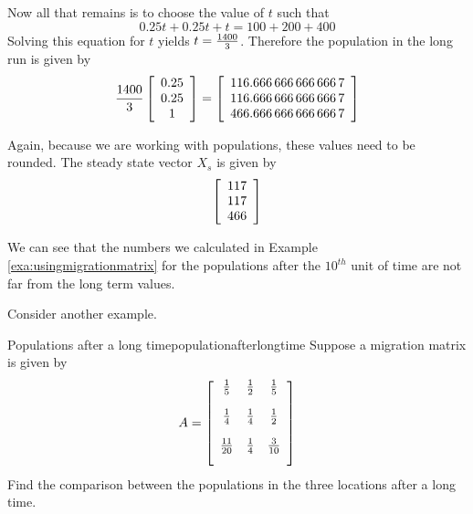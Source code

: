 \begin{solution}
Now all that remains is to choose the value of $t$ such that
\begin{equation*}
0.25t+0.25t+t=100+200+400
\end{equation*}
Solving this equation for $t$ yields $t=\vspace{.05in} \frac{1400}{3}$. Therefore the population in the long run
is given by
\begin{equation*}
\vspace{.05in} \frac{1400}{3}\leftB
\begin{array}{c}
0.25 \\
0.25 \\
1
\end{array}
\rightB = \leftB
\begin{array}{c}
116. 666\,666\,666\, 666\,7 \\
116. 666\,666\,666\, 666\,7 \\
466. 666\,666\,666\, 666\,7
\end{array}
\rightB 
\end{equation*}

Again, because we are working with populations, these values need to be rounded. The steady state vector $X_s$ is given by
\[
\left[
\begin{array}{c}
117 \\
117 \\
466
\end{array}
\right] 
\]
\end{solution}

We can see that the numbers we calculated in Example \ref{exa:usingmigrationmatrix} for the populations
after the $10^{th}$ unit of time are not far from the long term values. 

Consider another example.

\begin{example}{Populations after a long time}{populationafterlongtime}
Suppose a migration matrix is given by 
\begin{equation*}
A = \leftB
\begin{array}{ccc}
\vspace{.05in} \frac{1}{5} & \vspace{.05in} \frac{1}{2} & \vspace{.05in}
\frac{1}{5} \\
\vspace{.05in} \frac{1}{4} & \vspace{.05in} \frac{1}{4} & \vspace{.05in}
\frac{1}{2} \\
\vspace{.05in} \frac{11}{20} & \vspace{.05in} \frac{1}{4} & \vspace{.05in}
\frac{3}{10}
\end{array}
\rightB 
\end{equation*}
 Find the comparison between the populations in the three
locations after a long time.
\end{example}

